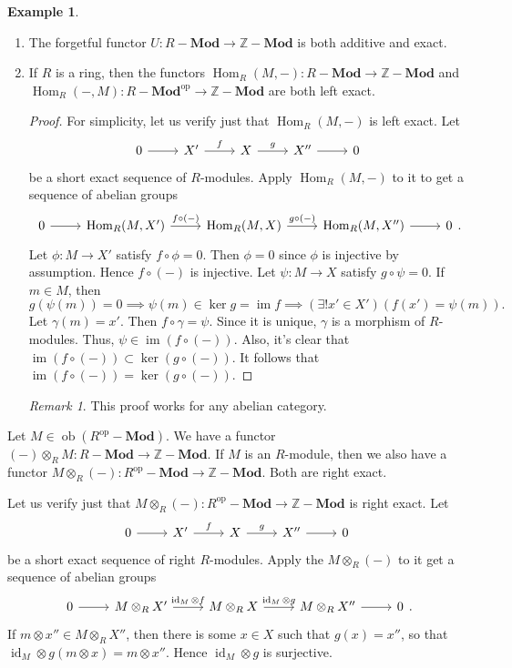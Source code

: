 \documentclass[10pt,letterpaper,cm]{nupset}
\theoremstyle{definition}
\newtheorem{exmp}[definition]{Example}
\theoremstyle{theorem}
\theoremstyle{remark}
\newtheorem{remark}[definition]{Remark}
\newcommand{\Z}{\mathbb Z}
\newcommand{\1}{\mathbf{1}}
\newcommand{\0}{\vec 0}
\DeclareMathOperator{\id}{\mathrm{id}}
\DeclareMathOperator{\op}{op}
\DeclareMathOperator{\im}{im}
\DeclareMathOperator{\ob}{ob}
\DeclareMathOperator{\Hom}{Hom}
\begin{document}
\begin{exmp} $ $
\begin{enumerate}
\item  The forgetful functor $U : R{-}\mathbf{Mod} \to \Z{-}\mathbf{Mod}$ is both additive and exact.
\item If $R$ is a ring, then the functors $\Hom_R(M, -) : R{-}\mathbf{Mod} \to \Z{-}\mathbf{Mod}$ and $\Hom_R(-, M) :R{-}\mathbf{Mod}^{\op} \to \Z{-} \mathbf{Mod}$ are both left exact.
\begin{proof}
For simplicity, let us verify just that $\Hom_R(M, -)$ is left exact. Let 
\[
\begin{tikzcd}
0 \arrow[r] & X' \arrow[r, "f"] & X \arrow[r, "g"] & X'' \arrow[r] & 0
\end{tikzcd} 
\] be a short exact sequence of $R$-modules. Apply $\Hom_R(M, -)$ to it to get a sequence of abelian groups
\[
\begin{tikzcd}
0 \arrow[r] & {\Hom_R(M, X')} \arrow[r, "f\circ (-)"] & {\Hom_R(M,X)} \arrow[r, "g\circ (-)"] & {\Hom_R(M, X'')} \arrow[r] & 0
\end{tikzcd}
.\]
Let $\phi : M \to X'$ satisfy $f \circ \phi = 0$. Then $\phi =0$ since $\phi$ is injective by assumption. Hence $f \circ (-)$ is injective.  Let $\psi : M \to X$ satisfy $g \circ \psi =0$. If $m \in M$, then $$g(\psi(m)) =0 \implies \psi(m) \in \ker{g} = \im f \implies \left(\exists!x' \in X'\right)\left(f(x') = \psi(m)\right).$$ Let $\gamma(m) = x'.$ Then $f \circ \gamma  = \psi$. Since it is unique, $\gamma$ is a morphism of $R$-modules. Thus, $\psi \in \im(f \circ (-))$. Also, it's clear that $\im(f \circ (-)) \subset \ker(g \circ (-))$. It follows that $\im(f \circ (-)) = \ker(g \circ (-))$.
\end{proof}
\begin{remark}
This proof works for any abelian category.
\end{remark}
\end{enumerate}
\end{exmp}

\medskip

Let $M \in \ob(R^{\op}{-}\mathbf{Mod})$. We have a functor $\left({-}\right) \otimes_R M : R{-}\mathbf{Mod} \to \Z {-}\mathbf{Mod}$. If $M$ is an $R$-module, then we also have a functor $M \otimes_R (-) : R^{\op}{-}\mathbf{Mod} \to \Z{-}\mathbf{Mod}$. Both are right exact.

Let us verify just that $M \otimes_R (-) : R^{\op}{-}\mathbf{Mod} \to \Z{-}\mathbf{Mod}$ is right exact.  Let 
\[
\begin{tikzcd}
0 \arrow[r] & X' \arrow[r, "f"] & X \arrow[r, "g"] & X'' \arrow[r] & 0
\end{tikzcd} 
\] be a short exact sequence of  right $R$-modules. Apply the $M \otimes_R (-)$ to it get a sequence of abelian groups
\[
\begin{tikzcd}
0 \arrow[r] & M\otimes_R X' \arrow[r, "\id_M \otimes f"] & M\otimes_R X \arrow[r, "\id_M \otimes g"] & M\otimes_R X'' \arrow[r] & 0
\end{tikzcd}.
\]
If $ m \otimes x'' \in M \otimes_R X''$, then there is some $x \in X$ such that $g(x) = x''$, so that $\id_M \otimes g(m \otimes x) = m\otimes x''$. Hence $\id_M \otimes g$ is surjective. 
\end{document}
